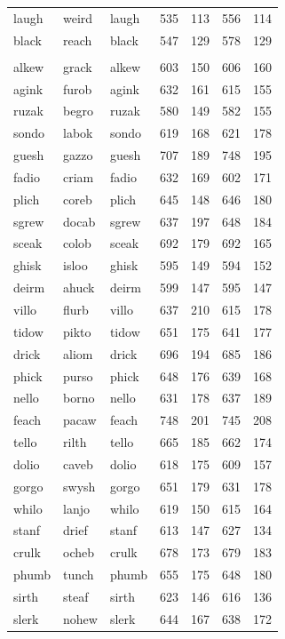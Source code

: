 \documentclass[
]{interact}
\begin{document}
\begin{table}
\begin{tabular*}{\linewidth}{@{\extracolsep{\fill}}lllrrrr}
laugh & weird & laugh & 535 & 113 & 556 & 114 \\ 
black & reach & black & 547 & 129 & 578 & 129 \\ 
\midrule\addlinespace[2.5pt]
\multicolumn{7}{l}{non-word} \\[2.5pt] 
\midrule\addlinespace[2.5pt]
alkew & grack & alkew & 603 & 150 & 606 & 160 \\ 
agink & furob & agink & 632 & 161 & 615 & 155 \\ 
ruzak & begro & ruzak & 580 & 149 & 582 & 155 \\ 
sondo & labok & sondo & 619 & 168 & 621 & 178 \\ 
guesh & gazzo & guesh & 707 & 189 & 748 & 195 \\ 
fadio & criam & fadio & 632 & 169 & 602 & 171 \\ 
plich & coreb & plich & 645 & 148 & 646 & 180 \\ 
sgrew & docab & sgrew & 637 & 197 & 648 & 184 \\ 
sceak & colob & sceak & 692 & 179 & 692 & 165 \\ 
ghisk & isloo & ghisk & 595 & 149 & 594 & 152 \\ 
deirm & ahuck & deirm & 599 & 147 & 595 & 147 \\ 
villo & flurb & villo & 637 & 210 & 615 & 178 \\ 
tidow & pikto & tidow & 651 & 175 & 641 & 177 \\ 
drick & aliom & drick & 696 & 194 & 685 & 186 \\ 
phick & purso & phick & 648 & 176 & 639 & 168 \\ 
nello & borno & nello & 631 & 178 & 637 & 189 \\ 
feach & pacaw & feach & 748 & 201 & 745 & 208 \\ 
tello & rilth & tello & 665 & 185 & 662 & 174 \\ 
dolio & caveb & dolio & 618 & 175 & 609 & 157 \\ 
gorgo & swysh & gorgo & 651 & 179 & 631 & 178 \\ 
whilo & lanjo & whilo & 619 & 150 & 615 & 164 \\ 
stanf & drief & stanf & 613 & 147 & 627 & 134 \\ 
crulk & ocheb & crulk & 678 & 173 & 679 & 183 \\ 
phumb & tunch & phumb & 655 & 175 & 648 & 180 \\ 
sirth & steaf & sirth & 623 & 146 & 616 & 136 \\ 
slerk & nohew & slerk & 644 & 167 & 638 & 172 \\ 

\end{tabular*}
\end{table}
\end{document}
